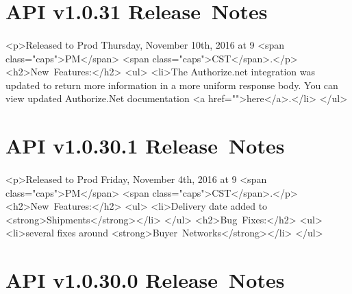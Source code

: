 \documentclass{memoir}%
\begin{document}
%
\section*{API v1.0.31 Release~Notes}%
\paragraph*{}%

%
\paragraph*{}%
<p>Released to Prod Thursday, November 10th, 2016 at 9 <span class="caps">PM</span> <span class="caps">CST</span>.</p>\newline%
<h2>New~Features:</h2>\newline%
<ul>\newline%
<li>The Authorize.net integration was updated to return more information in a more uniform response body. You can view updated Authorize.Net documentation <a href="">here</a>.</li>\newline%
</ul>

%
\section*{API v1.0.30.1 Release~Notes}%
\paragraph*{}%

%
\paragraph*{}%
<p>Released to Prod Friday, November 4th, 2016 at 9 <span class="caps">PM</span> <span class="caps">CST</span>.</p>\newline%
<h2>New~Features:</h2>\newline%
<ul>\newline%
<li>Delivery date added to <strong>Shipments</strong></li>\newline%
</ul>\newline%
<h2>Bug~Fixes:</h2>\newline%
<ul>\newline%
<li>several fixes around <strong>Buyer~Networks</strong></li>\newline%
</ul>

%
\section*{API v1.0.30.0 Release~Notes}%
\end{document}
